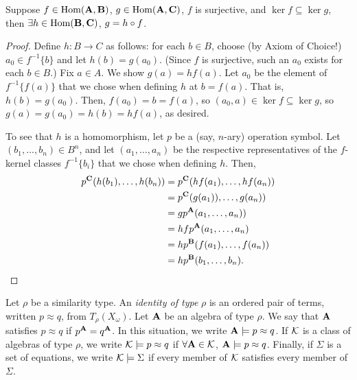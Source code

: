 \documentclass[11pt]{amsart}  %
\begin{document}
\begin{lemma}
  \label{ex:1.26.8}
  Suppose $f \in \operatorname{Hom}(\mathbf{A},\mathbf{B})$, $g \in \operatorname{Hom}(\mathbf{A},\mathbf{C})$, 
  $f$ is surjective, and $\ker f \subseteq \ker g$, then $\exists h \in \operatorname{Hom}(\mathbf{B},\mathbf{C})$, $g = h \circ f$.
\end{lemma}
\begin{proof}
Define $h\colon B \to C$ as follows: for each $b\in B$, choose (by Axiom of Choice!) $a_0\in f^{-1}\{b\}$
and let $h(b) = g(a_0)$.  (Since $f$ is surjective, such an $a_0$ exists for each $b\in B$.)
Fix $a \in A$.  We show $g(a) = h f(a)$. Let $a_0$ be the element of $f^{-1}\{f(a)\}$ that we
chose when defining $h$ at $b = f(a)$. That is, $h(b) = g(a_0)$.
Then, $f(a_0) = b = f(a)$, so $(a_0, a) \in \ker f\subseteq \ker g$, so 
$g(a) = g(a_0) = h(b) = h f(a)$, as desired.

To see that $h$ is a homomorphism, let $p$ be a (say, $n$-ary) operation symbol.
Let $(b_1, \dots, b_n) \in B^n$, and let $(a_1, \dots, a_n)$ be the respective representatives
of the $f$-kernel classes $f^{-1}\{b_i\}$ that we chose when defining $h$.
Then,
\begin{align*}
p^{\mathbf{C}}(h(b_1), \dots, h(b_n)) &=  p^{\mathbf{C}}(h f(a_1), \dots, h f(a_n))\\
&=  p^{\mathbf{C}}(g(a_1)), \dots, g(a_n))\\
&=  g p^{\mathbf{A}}(a_1, \dots, a_n))\\
&=  h f p^{\mathbf{A}}(a_1, \dots, a_n)\\
&=  h p^{\mathbf{B}}(f(a_1), \dots, f(a_n))\\
&=  h p^{\mathbf{B}}(b_1, \dots, b_n).
\end{align*}
\end{proof}


\begin{definition}
Let $\rho$ be a similarity type. 
An \emph{identity of type} $\rho$ is an ordered pair of terms, written 
$p \approx q$, from $T_\rho(X_\omega)$. Let $\mathbf{A}$ be an algebra of type $\rho$.
We say that $\mathbf{A}$ satisfies $p\approx q$ if $p^{\mathbf{A}} = q^{\mathbf{A}}$. 
In this situation, we write $\mathbf{A} \models p \approx q$.
If $\mathcal{K}$ is a class of algebras of type $\rho$, we write 
$\mathcal{K} \models p \approx q$ if $\forall \mathbf{A} \in \mathcal{K}$, 
$\mathbf{A} \models p \approx q$. Finally, if $\Sigma$ is a set of equations, 
we write $\mathcal{K} \models \Sigma$ if every member of $\mathcal{K}$ satisfies
every member of $\Sigma$.
\end{definition}
\end{document}
